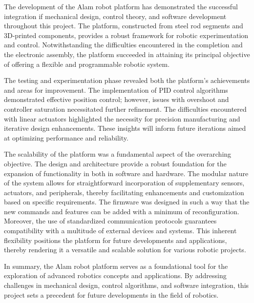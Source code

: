 The development of the Alam robot platform has demonstrated the successful integration if mechanical design, control theory, and software development throughout this project. The platform, constructed from steel rod segments and 3D-printed components, provides a robust framework for robotic experimentation and control. Notwithstanding the difficulties encountered in the completion and the electronic assembly, the platform succeeded in attaining its principal objective of offering a flexible and programmable robotic system.

The testing and experimentation phase revealed both the platform's achievements and areas for improvement. The implementation of PID control algorithms demonstrated effective position control; however, issues with overshoot and controller saturation necessitated further refinement. The difficulties encountered with linear actuators highlighted the necessity for precision manufacturing and iterative design enhancements. These insights will inform future iterations aimed at optimizing performance and reliability.

The scalability of the platform was a fundamental aspect of the overarching objective. The design and architecture provide a robust foundation for the expansion of functionality in both in software and hardware. The modular nature of the system allows for straightforward incorporation of supplementary sensors, actuators, and peripherals, thereby facilitating enhancements and customization based on specific requirements. The firmware was designed in such a way that the new commands and features can be added with a minimum of reconfiguration. Moreover, the use of standardized communication protocols guarantees compatibility with a multitude of external devices and systems. This inherent flexibility positions the platform for future developments and applications, thereby rendering it a versatile and scalable solution for various robotic projects.

In summary, the Alam robot platform serves as a foundational tool for the exploration of advanced robotics concepts and applications. By addressing challenges in mechanical design, control algorithms, and software integration, this project sets a precedent for future developments in the field of robotics. 